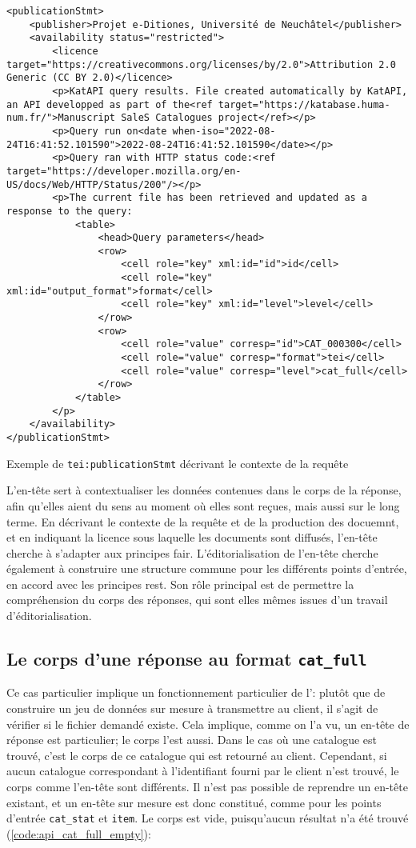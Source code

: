 \begin{listing}[p]
	\begin{verbatim}
<publicationStmt>
	<publisher>Projet e-Ditiones, Université de Neuchâtel</publisher>
	<availability status="restricted">
		<licence target="https://creativecommons.org/licenses/by/2.0">Attribution 2.0 Generic (CC BY 2.0)</licence>
		<p>KatAPI query results. File created automatically by KatAPI, an API developped as part of the<ref target="https://katabase.huma-num.fr/">Manuscript SaleS Catalogues project</ref></p>
		<p>Query run on<date when-iso="2022-08-24T16:41:52.101590">2022-08-24T16:41:52.101590</date></p>
		<p>Query ran with HTTP status code:<ref target="https://developer.mozilla.org/en-US/docs/Web/HTTP/Status/200"/></p>
		<p>The current file has been retrieved and updated as a response to the query:
			<table>
				<head>Query parameters</head>
				<row>
					<cell role="key" xml:id="id">id</cell>
					<cell role="key" xml:id="output_format">format</cell>
					<cell role="key" xml:id="level">level</cell>
				</row>
				<row>
					<cell role="value" corresp="id">CAT_000300</cell>
					<cell role="value" corresp="format">tei</cell>
					<cell role="value" corresp="level">cat_full</cell>
				</row>
			</table>
		</p>
	</availability>
</publicationStmt>
	\end{verbatim}
	\caption{Exemple de \texttt{tei:publicationStmt} décrivant le contexte de la requête}
	\label{code:api_header_context_tei}
\end{listing}

L'en-tête sert à contextualiser les données contenues dans le corps de la réponse, afin qu'elles aient du sens au moment où elles sont reçues, mais aussi sur le long terme. En décrivant le contexte de la requête et de la production des docuemnt, et en indiquant la licence sous laquelle les documents sont diffusés, l'en-tête cherche à s'adapter aux principes \gls{fair}. L'éditorialisation de l'en-tête cherche également à construire une structure commune pour les différents points d'entrée, en accord avec les principes \gls{rest}. Son rôle principal est de permettre la compréhension du corps des réponses, qui sont elles mêmes issues d'un travail d'éditorialisation.

\subsection{Le corps d'une réponse au format \texttt{cat\_full}}
Ce cas particulier implique un fonctionnement particulier de l'\api{}: plutôt que de construire un jeu de données sur mesure à transmettre au client, il s'agit de vérifier si le fichier demandé existe. Cela implique, comme on l'a vu, un en-tête de réponse est particulier; le corps l'est aussi. Dans le cas où une catalogue est trouvé, c'est le corps de ce catalogue qui est retourné au client. Cependant, si aucun catalogue correspondant à l'identifiant fourni par le client n'est trouvé, le corps comme l'en-tête sont différents. Il n'est pas possible de reprendre un en-tête existant, et un en-tête sur mesure est donc constitué, comme pour les points d'entrée \texttt{cat\_stat} et \texttt{item}. Le corps est vide, puisqu'aucun résultat n'a été trouvé (\ref{code:api_cat_full_empty}):

